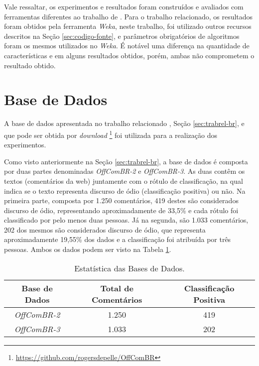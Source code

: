 Vale ressaltar, os experimentos e resultados foram construídos e avaliados com ferramentas diferentes ao trabalho de \cite{Pelle2017}. Para o trabalho relacionado, os resultados foram obtidos pela ferramenta {\it Weka}, neste trabalho, foi utilizado outros recursos descritos na Seção \ref{sec:codigo-fonte}, e parâmetros obrigatórios de algoritmos foram os mesmos utilizados no {\it Weka}. É notável uma diferença na quantidade de características e em alguns resultados obtidos, porém, ambas não comprometem o resultado obtido. 

\section{Base de Dados}\label{sec:proposta-base-dados}
A base de dados apresentada no trabalho relacionado \cite{Pelle2017}, Seção \ref{sec:trabrel-br}, e que pode ser obtida por {\it download} \footnote{\url{https://github.com/rogersdepelle/OffComBR}} foi utilizada para a realização dos experimentos.

Como visto anteriormente na Seção \ref{sec:trabrel-br}, a base de dados é composta por duas partes denominadas {\it OffComBR-2} e {\it OffComBR-3}. As duas contêm os textos (comentários da web) juntamente com o rótulo de classificação, na qual indica se o texto representa discurso de ódio (classificação positiva) ou não. Na primeira parte, composta por 1.250 comentários, 419 destes são considerados discurso de ódio, representando aproximadamente de 33,5\% e cada rótulo foi classificado por pelo menos duas pessoas. Já na segunda, são 1.033 comentários, 202 dos mesmos são considerados discurso de ódio, que representa aproximadamente 19,55\% dos dados e a classificação foi atribuída por três pessoas. Ambos os dados podem ser visto na Tabela \ref{tab:proposta-base-dados}.

\begin{table}[h]
    \centering
    {\renewcommand \arraystretch{1.25}
        \begin{tabular}{ c c c }
            \hline
            {\bf Base de Dados} & {\bf Total de Comentários} & {\bf Classificação Positiva} \\
            \hline
            
            {\it OffComBR-2} & 1.250 & 419 \\
            {\it OffComBR-3} & 1.033 & 202 \\  
            \hline
        \end{tabular} 
    }
    \caption{Estatística das Bases de Dados.}\label{tab:proposta-base-dados}
\end{table}

